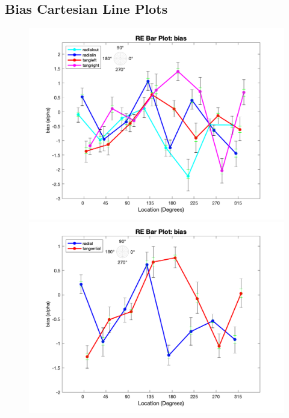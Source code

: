 \documentclass[11pt]{article} %
\begin{document}
\subsection{Bias Cartesian Line Plots}
\begin{figure}[H]
\centering %
\includegraphics[scale=.3]{Images/RE_LP_bias_Alldata_4conds.png}
\includegraphics[scale=.3]{Images/RE_LP_bias_Alldata_2conds.png}
\end{figure}
\end{document}
